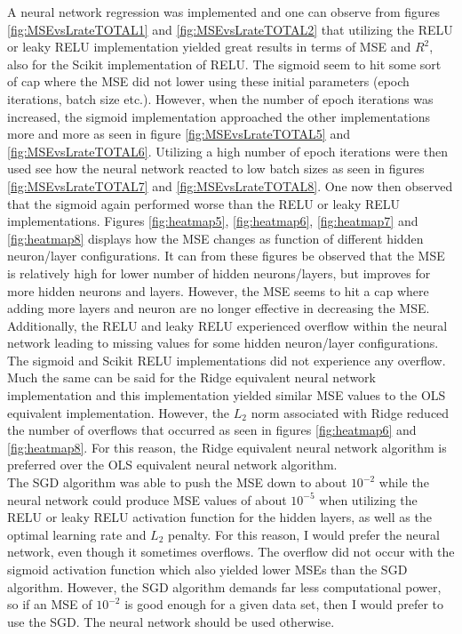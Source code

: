 \documentclass[12pt,a4paper]{article}
\begin{document}
A neural network regression was implemented and one can observe from figures \ref{fig:MSEvsLrateTOTAL1} and \ref{fig:MSEvsLrateTOTAL2} that utilizing the RELU or leaky RELU implementation yielded great results in terms of MSE and $R^2$, also for the Scikit implementation of RELU. The sigmoid seem to hit some sort of cap where the MSE did not lower using these initial parameters (epoch iterations, batch size etc.). However, when the number of epoch iterations was increased, the sigmoid implementation approached the other implementations more and more as seen in figure \ref{fig:MSEvsLrateTOTAL5} and \ref{fig:MSEvsLrateTOTAL6}. Utilizing a high number of epoch iterations were then used see how the neural network reacted to low batch sizes as seen in figures \ref{fig:MSEvsLrateTOTAL7} and \ref{fig:MSEvsLrateTOTAL8}. One now then observed that the sigmoid again performed worse than the RELU or leaky RELU implementations. Figures \ref{fig:heatmap5}, \ref{fig:heatmap6}, \ref{fig:heatmap7} and \ref{fig:heatmap8} displays how the MSE changes as function of different hidden neuron/layer configurations. It can from these figures be observed that the MSE is relatively high for lower number of hidden neurons/layers, but improves for more hidden neurons and layers. However, the MSE seems to hit a cap where adding more layers and neuron are no longer effective in decreasing the MSE. Additionally, the RELU and leaky RELU experienced overflow within the neural network leading to missing values for some hidden neuron/layer configurations. The sigmoid and Scikit RELU implementations did not experience any overflow.
\\
Much the same can be said for the Ridge equivalent neural network implementation and this implementation yielded similar MSE values to the OLS equivalent implementation. However, the $L_2$ norm associated with Ridge reduced the number of overflows that occurred as seen in figures \ref{fig:heatmap6} and \ref{fig:heatmap8}. For this reason, the Ridge equivalent neural network algorithm is preferred over the OLS equivalent neural network algorithm.
\\
The SGD algorithm was able to push the MSE down to about $10^{-2}$ while the neural network could produce MSE values of about $10^{-5}$ when utilizing the RELU or leaky RELU activation function for the hidden layers, as well as the optimal learning rate and $L_2$ penalty. For this reason, I would prefer the neural network, even though it sometimes overflows. The overflow did not occur with the sigmoid activation function which also yielded lower MSEs than the SGD algorithm. However, the SGD algorithm demands far less computational power, so if an MSE of $10^{-2}$ is good enough for a given data set, then I would prefer to use the SGD. The neural network should be used otherwise.
\end{document}
